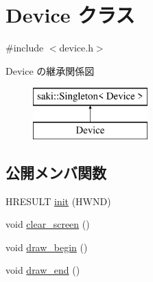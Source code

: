 \hypertarget{class_device}{}\section{Device クラス}
\label{class_device}


{\ttfamily \#include $<$device.\+h$>$}

Device の継承関係図\begin{figure}[H]
\begin{center}
\leavevmode
\includegraphics[height=2.000000cm]{class_device}
\end{center}
\end{figure}
\subsection*{公開メンバ関数}
\begin{DoxyCompactItemize}
\item 
H\+R\+E\+S\+U\+LT \mbox{\hyperlink{class_device_a8fc449792bf98bab448683f6815446e9}{init}} (H\+W\+ND)
\item 
void \mbox{\hyperlink{class_device_a17cd76103195bae419de11d43a4eeecd}{clear\+\_\+screen}} ()
\item 
void \mbox{\hyperlink{class_device_a066c09b28fab69581e18459f45daa6a6}{draw\+\_\+begin}} ()
\item 
void \mbox{\hyperlink{class_device_aa7c7313576c3274087b872a915fa181e}{draw\+\_\+end}} ()
\end{DoxyCompactItemize}
